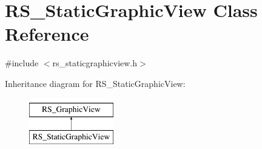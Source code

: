 \hypertarget{classRS__StaticGraphicView}{\section{R\-S\-\_\-\-Static\-Graphic\-View Class Reference}
\label{classRS__StaticGraphicView}
}


{\ttfamily \#include $<$rs\-\_\-staticgraphicview.\-h$>$}

Inheritance diagram for R\-S\-\_\-\-Static\-Graphic\-View\-:\begin{figure}[H]
\begin{center}
\leavevmode
\includegraphics[height=2.000000cm]{classRS__StaticGraphicView}
\end{center}
\end{figure}
